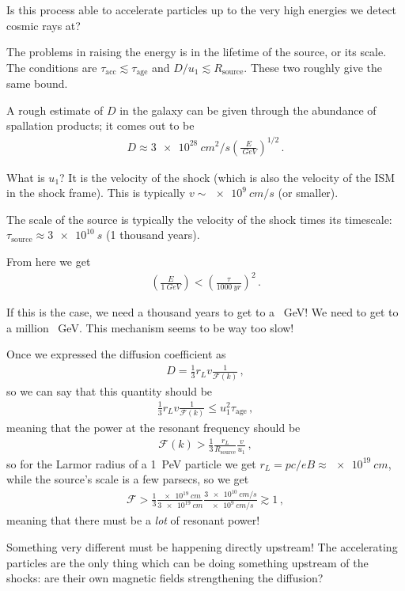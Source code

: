 \documentclass[main.tex]{subfiles}
\begin{document}
Is this process able to accelerate particles up to the very high energies we detect cosmic rays at? 

The problems in raising the energy is in the lifetime of the source, or its scale. 
The conditions are \(\tau _{\text{acc}} \lesssim \tau _{\text{age}}\) and \(D / u_1 \lesssim R _{\text{source}}\). 
These two roughly give the same bound. 

A rough estimate of \(D\) in the galaxy can be given through the abundance of spallation products; it comes out to be 
%
\begin{align}
D \approx \SI{3e28}{cm^2 / s}  \left( \frac{E}{\SI{}{GeV}}\right)^{1/2}
\,.
\end{align}

What is \(u_1 \)? It is the velocity of the shock (which is also the velocity of the ISM in the shock frame). 
This is typically \(v \sim \SI{e9}{cm /s}\) (or smaller). 

The scale of the source is typically the velocity of the shock times its timescale: \(\tau _{\text{source}} \approx \SI{3e10}{s}\) (1 thousand years). 

From here we get 
%
\begin{align}
\left( \frac{E}{\SI{1}{GeV}}\right) < \left( \frac{\tau}{\SI{1000}{yr}}\right)^{2}
\,.
\end{align}

If this is the case, we need a thousand years to get to a \SI{}{GeV}! 
We need to get to a million \SI{}{GeV}. This mechanism seems to be way too slow! 

Once we expressed the diffusion coefficient as 
%
\begin{align}
D = \frac{1}{3} r_L v \frac{1}{\mathscr{F}(k)}
\,,
\end{align}
%
so we can say that this quantity should be 
%
\begin{align}
\frac{1}{3} r_L v \frac{1}{\mathscr{F}(k)} \leq u_1^2 \tau _{\text{age}}
\,,
\end{align}
%
meaning that the power at the resonant frequency should be 
%
\begin{align}
\mathscr{F}(k) > \frac{1}{3} \frac{r_L}{R _{\text{source}}} \frac{v}{u_1 }
\,,
\end{align}
%
so for the Larmor radius of a \SI{1}{PeV} particle we get \(r_L = pc / eB \approx \SI{e19}{cm}\), while the source's scale is a few parsecs, so we get 
%
\begin{align}
\mathscr{F} > \frac{1}{3} \frac{\SI{e19}{cm}}{\SI{3e19}{cm}} \frac{\SI{3e10}{cm/s}}{\SI{e9}{cm/s}} \gtrsim 1
\,,
\end{align}
%
meaning that there must be a \emph{lot} of resonant power! 

Something very different must be happening directly upstream! 
The accelerating particles are the only thing which can be doing something upstream of the shocks: are their own magnetic fields strengthening the diffusion?
\end{document}
